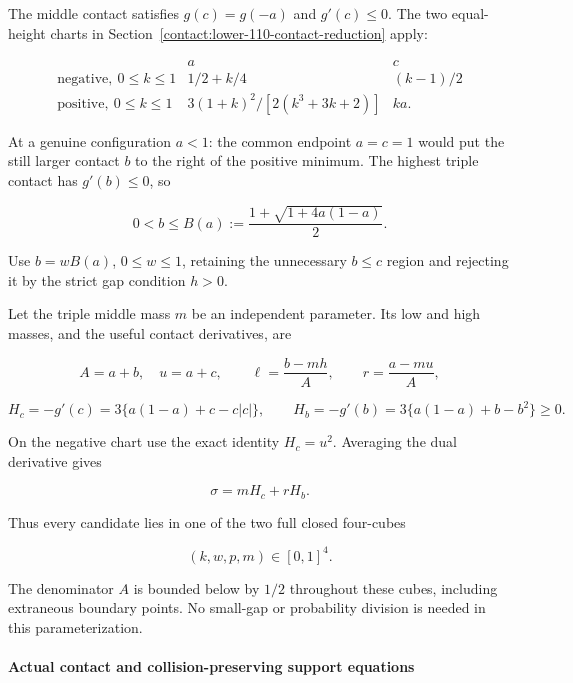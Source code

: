 The middle contact satisfies $g(c)=g(-a)$ and $g'(c)\le0$.
The two equal-height charts in Section~\ref{contact:lower-110-contact-reduction} apply:

\[
 \begin{array}{c|c|c}
 &a&c\\ \hline
 \text{negative},\ 0\leq k\leq1 &1/2+k/4 &(k-1)/2\\
 \text{positive},\ 0\leq k\leq1
   &3(1+k)^2/[2(k^3+3k+2)] &ka.
 \end{array}
\tag{B.15.3}\label{contact:collision-221-contact-reduction-3}
\]

At a genuine configuration $a<1$: the common endpoint $a=c=1$ would
put the still larger contact $b$ to the right of the positive minimum.
The highest triple contact has $g'(b)\le 0$, so

\[
 0<b\leq B(a):=\frac{1+\sqrt{1+4a(1-a)}}2.
\]

Use $b=w B(a)$, $0\le w\le 1$, retaining the unnecessary $b\le c$ region
and rejecting it by the strict gap condition $h>0$.

Let the triple middle mass $m$ be an independent parameter. Its low and
high masses, and the useful contact derivatives, are

\[
 A=a+b,\quad u=a+c,\qquad
 \ell=\frac{b-mh}{A},\qquad r=\frac{a-mu}{A},
\tag{B.15.4}\label{contact:collision-221-contact-reduction-4}
\]

\[
 H_c=-g'(c)=3\{a(1-a)+c-c|c|\},\qquad
 H_b=-g'(b)=3\{a(1-a)+b-b^2\}\geq0.
\]

On the negative chart use the exact identity $H_c=u^2$. Averaging the
dual derivative gives

\[
 \boxed{\quad \sigma=mH_c+rH_b.\quad}
\tag{B.15.5}\label{contact:collision-221-contact-reduction-5}
\]

Thus every candidate lies in one of the two full closed four-cubes

\[
 \boxed{\quad (k,w,p,m)\in[0,1]^4.\quad}
\tag{B.15.6}\label{contact:collision-221-contact-reduction-6}
\]

The denominator $A$ is bounded below by $1/2$ throughout these cubes,
including extraneous boundary points. No small-gap or probability
division is needed in this parameterization.

\paragraph{Actual contact and collision-preserving support equations}

